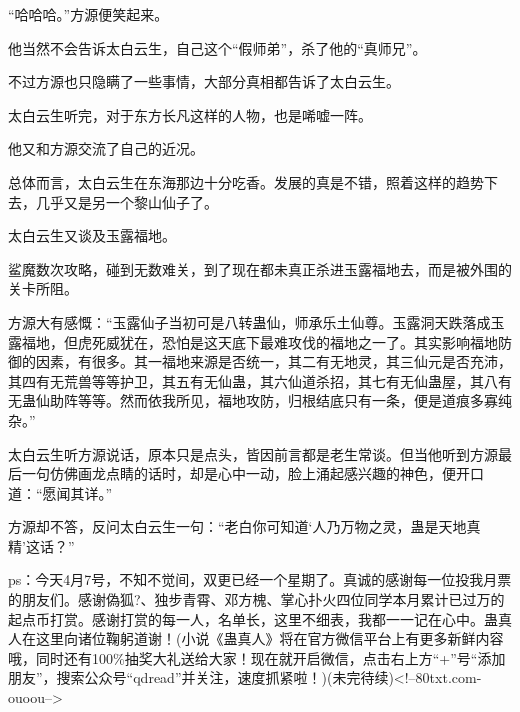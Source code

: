 \begin{this_body}
“哈哈哈。”方源便笑起来。

他当然不会告诉太白云生，自己这个“假师弟”，杀了他的“真师兄”。

不过方源也只隐瞒了一些事情，大部分真相都告诉了太白云生。

太白云生听完，对于东方长凡这样的人物，也是唏嘘一阵。

他又和方源交流了自己的近况。

总体而言，太白云生在东海那边十分吃香。发展的真是不错，照着这样的趋势下去，几乎又是另一个黎山仙子了。

太白云生又谈及玉露福地。

鲨魔数次攻略，碰到无数难关，到了现在都未真正杀进玉露福地去，而是被外围的关卡所阻。

方源大有感慨：“玉露仙子当初可是八转蛊仙，师承乐土仙尊。玉露洞天跌落成玉露福地，但虎死威犹在，恐怕是这天底下最难攻伐的福地之一了。其实影响福地防御的因素，有很多。其一福地来源是否统一，其二有无地灵，其三仙元是否充沛，其四有无荒兽等等护卫，其五有无仙蛊，其六仙道杀招，其七有无仙蛊屋，其八有无蛊仙助阵等等。然而依我所见，福地攻防，归根结底只有一条，便是道痕多寡纯杂。”

太白云生听方源说话，原本只是点头，皆因前言都是老生常谈。但当他听到方源最后一句仿佛画龙点睛的话时，却是心中一动，脸上涌起感兴趣的神色，便开口道：“愿闻其详。”

方源却不答，反问太白云生一句：“老白你可知道‘人乃万物之灵，蛊是天地真精’这话？”

ps：今天4月7号，不知不觉间，双更已经一个星期了。真诚的感谢每一位投我月票的朋友们。感谢偽狐?、独步青霄、邓方槐、掌心扑火四位同学本月累计已过万的起点币打赏。感谢打赏的每一人，名单长，这里不细表，我都一一记在心中。蛊真人在这里向诸位鞠躬道谢！(小说《蛊真人》将在官方微信平台上有更多新鲜内容哦，同时还有100\%抽奖大礼送给大家！现在就开启微信，点击右上方“+”号“添加朋友”，搜索公众号“qdread”并关注，速度抓紧啦！)(未完待续)<!--80txt.com-ouoou-->

\end{this_body}

